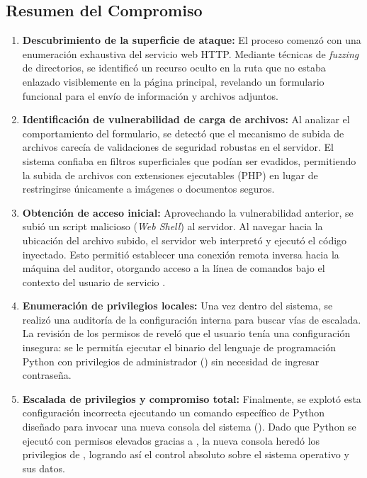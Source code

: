 \documentclass[a4paper]{article}
\begin{document}
\subsection{Resumen del Compromiso} 
\begin{enumerate}
    \item \textbf{Descubrimiento de la superficie de ataque:} 
    El proceso comenzó con una enumeración exhaustiva del servicio web HTTP. Mediante técnicas de \textit{fuzzing} de directorios, se identificó un recurso oculto en la ruta  que no estaba enlazado visiblemente en la página principal, revelando un formulario funcional para el envío de información y archivos adjuntos.

    \item \textbf{Identificación de vulnerabilidad de carga de archivos:} 
    Al analizar el comportamiento del formulario, se detectó que el mecanismo de subida de archivos carecía de validaciones de seguridad robustas en el servidor. El sistema confiaba en filtros superficiales que podían ser evadidos, permitiendo la subida de archivos con extensiones ejecutables (PHP) en lugar de restringirse únicamente a imágenes o documentos seguros.

    \item \textbf{Obtención de acceso inicial:} 
    Aprovechando la vulnerabilidad anterior, se subió un script malicioso (\textit{Web Shell}) al servidor. Al navegar hacia la ubicación del archivo subido, el servidor web interpretó y ejecutó el código inyectado. Esto permitió establecer una conexión remota inversa hacia la máquina del auditor, otorgando acceso a la línea de comandos bajo el contexto del usuario de servicio .

    \item \textbf{Enumeración de privilegios locales:} 
    Una vez dentro del sistema, se realizó una auditoría de la configuración interna para buscar vías de escalada. La revisión de los permisos de  reveló que el usuario  tenía una configuración insegura: se le permitía ejecutar el binario del lenguaje de programación Python con privilegios de administrador () sin necesidad de ingresar contraseña.

    \item \textbf{Escalada de privilegios y compromiso total:} 
    Finalmente, se explotó esta configuración incorrecta ejecutando un comando específico de Python diseñado para invocar una nueva consola del sistema (). Dado que Python se ejecutó con permisos elevados gracias a , la nueva consola heredó los privilegios de , logrando así el control absoluto sobre el sistema operativo y sus datos.
\end{enumerate}
\end{document}
